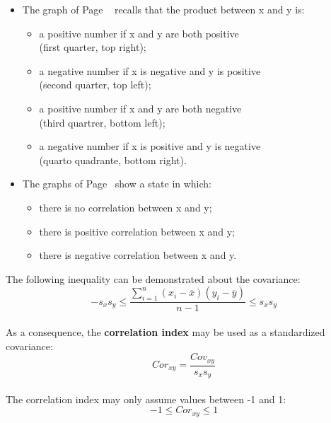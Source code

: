 \begin{frame}
  \begin{itemize}
    \item The graph of Page ~\pageref{fig:quadranti} recalls that the product between x and y is:
      \begin{itemize}
        \item a positive number if x and y are both positive\\ (first quarter, top right);
        \item a negative number if x is negative and y is positive\\ (second quarter, top left);
        \item a positive number if x and y are both negative\\ (third quartrer, bottom left);
        \item a negative number if x is positive and y is negative\\ (quarto quadrante, bottom right).
      \end{itemize}
    \vspace{0.5cm}
    \item The graphs of Page~\pageref{fig:correl} show a state in which:
      \begin{itemize}
        \item there is no correlation between x and y;
        \item there is positive correlation between x and y;
        \item there is negative correlation between x and y.
      \end{itemize}
  \end{itemize}
\end{frame}


\begin{frame}
  \vspace*{.1cm}
  The following inequality can be demonstrated about the covariance:\\
  \vspace*{.25cm}
  $$ -s_x s_y \leq \frac{\sum_{i=1}^n{\left( x_i-\overline{x}\right)\left( y_i-\overline{y}\right)}}{n-1} \leq s_xs_y $$\\
  \vspace*{.25cm}
  As a consequence, the \textbf{correlation index} may be used as a standardized covariance:\\
  \vspace*{.25cm}
  $$ Cor_{xy} = \frac{Cov_{xy}}{s_xs_y} $$\\
  \vspace*{.1cm}
  The correlation index may only assume values between -1 and 1:\\
  \vspace*{.25cm}
  $$ -1 \leq Cor_{xy} \leq 1 $$\\
\end{frame}


